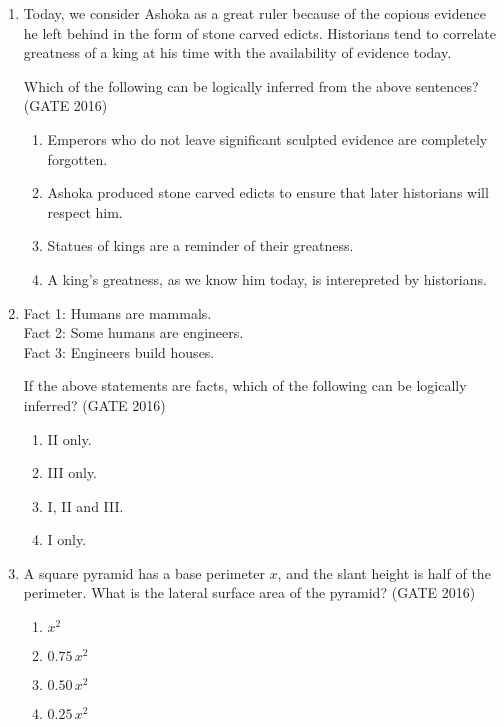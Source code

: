 \documentclass[journal,12pt,onecolumn]{IEEEtran}
\theoremstyle{remark}
\begin{document}
\begin{enumerate}
\item Today, we consider Ashoka as a great ruler because of the copious evidence he left behind in the form of stone carved edicts. Historians tend to correlate greatness of a king at his time with the availability of evidence today.  

Which of the following can be logically inferred from the above sentences?  
\hfill{(GATE 2016)}

\begin{enumerate}
    \item Emperors who do not leave significant sculpted evidence are completely forgotten.
    \item Ashoka produced stone carved edicts to ensure that later historians will respect him.
    \item Statues of kings are a reminder of their greatness.
    \item A king's greatness, as we know him today, is interepreted by historians.
\end{enumerate}
\vspace{1cm}

\item Fact 1: Humans are mammals. \\
Fact 2: Some humans are engineers. \\
Fact 3: Engineers build houses.  

If the above statements are facts, which of the following can be logically inferred?  
\hfill{(GATE 2016)}

\begin{enumerate}
    \item II only.
    \item III only.
    \item I, II and III.
    \item I only.
\end{enumerate}
\vspace{1cm}

\item A square pyramid has a base perimeter $x$, and the slant height is half of the perimeter. What is the lateral surface area of the pyramid?  
\hfill{(GATE 2016)}

\begin{enumerate}
    \item $x^2$
    \item $0.75\,x^2$
    \item $0.50\,x^2$
    \item $0.25\,x^2$
\end{enumerate}
\vspace{1cm}


\end{enumerate}
\end{document}
